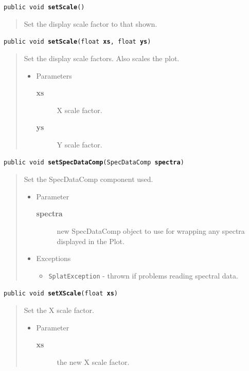 \documentclass[twoside,11pt]{article}
\renewcommand{\_}{\texttt{\symbol{95}}}
\newcommand{\method}[1]{\texttt{#1}}
\newenvironment{desc}{\begin{quote}}{\end{quote}}
\begin{document}
\method{public void \textbf{setScale}()\label{l204}\label{l205}}
\begin{desc}Set the display scale factor to that shown.
\end{desc}

\method{public void \textbf{setScale}(\texttt{float} \textbf{xs}, \texttt{float} \textbf{ys})\label{l206}\label{l207}}
\begin{desc}Set the display scale factors. Also scales the plot.
\begin{itemize}
\item{Parameters
  \begin{description}
   \item[\textbf{xs}]{X scale factor.}
   \item[\textbf{ys}]{Y scale factor.}
  \end{description}}
\end{itemize}
\end{desc}

\method{public void \textbf{setSpecDataComp}(\texttt{SpecDataComp} \textbf{spectra})\label{l208}\label{l209}}
\begin{desc}Set the SpecDataComp component used.
\begin{itemize}
\item{Parameter
  \begin{description}
   \item[\textbf{spectra}]{new SpecDataComp object to use for wrapping any
                spectra displayed in the Plot.}
  \end{description}}
\end{itemize}
\begin{itemize}
\item{{Exceptions}
  \begin{itemize}
   \item{\vspace{-.6ex}\texttt{SplatException} - thrown if problems reading spectral
            data.}
  \end{itemize}
}
\end{itemize}
\end{desc}

\method{public void \textbf{setXScale}(\texttt{float} \textbf{xs})\label{l210}\label{l211}}
\begin{desc}Set the X scale factor.
\begin{itemize}
\item{Parameter
  \begin{description}
   \item[\textbf{xs}]{the new X scale factor.}
  \end{description}}
\end{itemize}
\end{desc}
\end{document}
